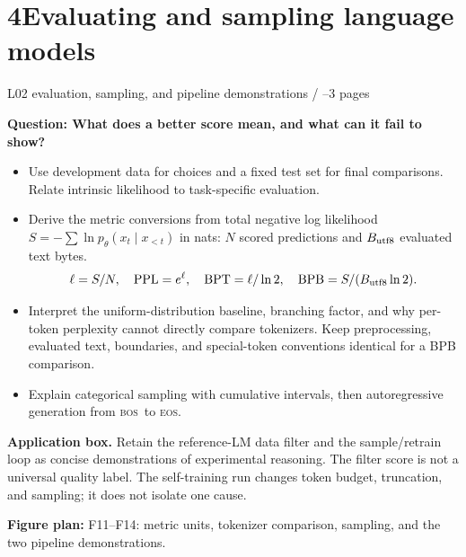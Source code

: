 \documentclass[11pt,a4paper]{article}
\newcommand{\sectionplan}[3]{%
  \section{\texorpdfstring{#1\quad #2}{#1 #2}}
  {\small\color{muted}#3\par}}
\newcommand{\tagline}[1]{\textcolor{courseblue}{\textbf{#1}}}
\newcommand{\figids}[1]{\textcolor{courseteal}{\textbf{Figure plan:} #1}}
\newcommand{\BOS}{\textsc{bos}}
\newcommand{\EOS}{\textsc{eos}}
\begin{document}
\sectionplan{4}{Evaluating and sampling language models}{L02 evaluation, sampling, and pipeline demonstrations \quad / \quad 2--3 pages}
\tagline{Question: What does a better score mean, and what can it fail to show?}
\begin{itemize}
  \item Use development data for choices and a fixed test set for final
  comparisons. Relate intrinsic likelihood to task-specific evaluation.
  \item Derive the metric conversions from total negative log likelihood
  $S=-\sum\ln p_\theta(x_t\mid x_{<t})$ in nats:
  $N$ scored predictions and $B_{\rm utf8}$ evaluated text bytes.
  \[
  \ell=S/N,\quad {\rm PPL}=e^\ell,\quad
  {\rm BPT}=\ell/\ln2,\quad {\rm BPB}=S/(B_{\rm utf8}\ln2).
  \]
  \item Interpret the uniform-distribution baseline, branching factor,
  and why per-token perplexity cannot directly compare tokenizers.
  Keep preprocessing, evaluated text, boundaries, and special-token
  conventions identical for a BPB comparison.
  \item Explain categorical sampling with cumulative intervals, then
  autoregressive generation from \BOS\ to \EOS.
\end{itemize}
\textbf{Application box.} Retain the reference-LM data filter and the
sample/retrain loop as concise demonstrations of experimental reasoning.
The filter score is not a universal quality label. The self-training run
changes token budget, truncation, and sampling; it does not isolate one cause.

\figids{F11--F14: metric units, tokenizer comparison, sampling, and
the two pipeline demonstrations.}
\end{document}
